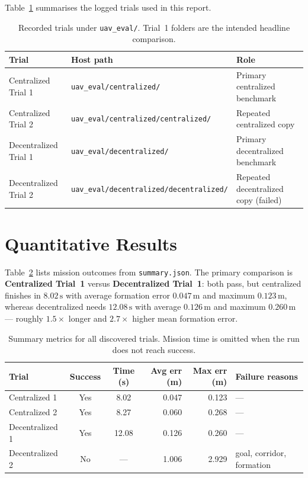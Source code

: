 \documentclass[a4paper,11pt]{article}
\begin{document}
Table~\ref{tab:settings} summarises the logged trials used in this report.

\begin{table}[H]
  \centering
  \scriptsize
  \setlength{\tabcolsep}{4pt}
  \renewcommand{\arraystretch}{0.9}
  \begin{tabularx}{\textwidth}{p{}X p{}}
    \toprule
    Trial & Host path & Role \\
    \midrule
    Centralized Trial 1 & \texttt{uav\_eval/centralized/} & Primary centralized benchmark \\
    Centralized Trial 2 & \texttt{uav\_eval/centralized/centralized/} & Repeated centralized copy \\
    Decentralized Trial 1 & \texttt{uav\_eval/decentralized/} & Primary decentralized benchmark \\
    Decentralized Trial 2 & \texttt{uav\_eval/decentralized/decentralized/} & Repeated decentralized copy (failed) \\
    \bottomrule
  \end{tabularx}
  \caption{Recorded trials under \texttt{uav\_eval/}. Trial~1 folders are the intended headline comparison.}
  \label{tab:settings}
\end{table}

\FloatBarrier
\section{Quantitative Results}

Table~\ref{tab:results} lists mission outcomes from \texttt{summary.json}. The primary comparison is \textbf{Centralized Trial~1} versus \textbf{Decentralized Trial~1}: both pass, but centralized finishes in $8.02\,\mathrm{s}$ with average formation error $0.047\,\mathrm{m}$ and maximum $0.123\,\mathrm{m}$, whereas decentralized needs $12.08\,\mathrm{s}$ with average $0.126\,\mathrm{m}$ and maximum $0.260\,\mathrm{m}$ --- roughly $1.5\times$ longer and $2.7\times$ higher mean formation error.

\begin{table}[H]
  \centering
  \small
  \setlength{\tabcolsep}{5pt}
  \begin{tabular}{lccrrl}
    \toprule
    Trial & Success & Time (s) & Avg err (m) & Max err (m) & Failure reasons \\
    \midrule
    Centralized 1 & Yes & 8.02 & 0.047 & 0.123 & --- \\
    Centralized 2 & Yes & 8.27 & 0.060 & 0.268 & --- \\
    Decentralized 1 & Yes & 12.08 & 0.126 & 0.260 & --- \\
    Decentralized 2 & No & --- & 1.006 & 2.929 & goal, corridor, formation \\
    \bottomrule
  \end{tabular}
  \caption{Summary metrics for all discovered trials. Mission time is omitted when the run does not reach success.}
  \label{tab:results}
\end{table}
\end{document}
